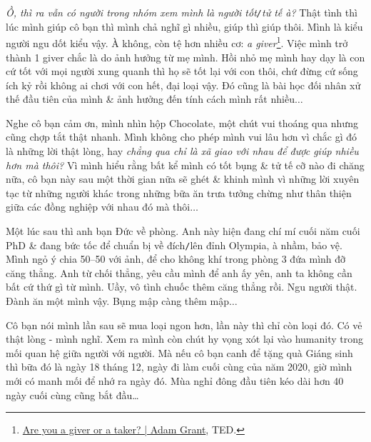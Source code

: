 \documentclass[12pt,twoside]{book}
\begin{document}
{\it Ồ, thì ra vẫn có người trong nhóm xem mình là người tốt{\tt/}tử tế à?} Thật tình thì lúc mình giúp cô bạn thì mình chả nghĩ gì nhiều, giúp thì giúp thôi. Mình là kiểu người ngu dốt kiểu vậy. À không, còn tệ hơn nhiều cơ: {\it a giver}\footnote{\href{https://www.youtube.com/watch?v=YyXRYgjQXX0}{Are you a giver or a taker? | Adam Grant}, TED.}. Việc mình trở thành 1 giver chắc là do ảnh hưởng từ mẹ mình. Hồi nhỏ mẹ mình hay dạy là con cứ tốt với mọi người xung quanh thì họ sẽ tốt lại với con thôi, chứ đừng cứ sống ích kỷ rồi không ai chơi với con hết, đại loại vậy. Đó cũng là bài học đối nhân xử thế đầu tiên của mình \& ảnh hưởng đến tính cách mình rất nhiều$\ldots$

Nghe cô bạn cảm ơn, mình nhìn hộp Chocolate, một chút vui thoáng qua nhưng cũng chợp tắt thật nhanh. Mình không cho phép mình vui lâu hơn vì chắc gì đó là những lời thật lòng, hay {\it chẳng qua chỉ là xã giao với nhau để được giúp nhiều hơn mà thôi?} Vì mình hiểu rằng bất kể mình có tốt bụng \& tử tế cỡ nào đi chăng nữa, cô bạn này sau một thời gian nữa sẽ ghét \& khinh mình vì những lời xuyên tạc từ những người khác trong những bữa ăn trưa tưởng chừng như thân thiện giữa các đồng nghiệp với nhau đó mà thôi$\ldots$

Một lúc sau thì anh bạn Đức về phòng. Anh này hiện đang chí mí cuối năm cuối PhD \& đang bức tốc để chuẩn bị về đích{\tt/}lên đỉnh Olympia, à nhầm, bảo vệ. Mình ngỏ ý chia 50--50 với ảnh, để cho không khí trong phòng 3 đứa mình đỡ căng thẳng. Anh từ chối thẳng, yêu cầu mình để anh ấy yên, anh ta không cần bất cứ thứ gì từ mình. Uầy, vô tình chuốc thêm căng thẳng rồi. Ngu người thật. Đành ăn một mình vậy. Bụng mập càng thêm mập$\ldots$

Cô bạn nói mình lần sau sẽ mua loại ngon hơn, lần này thì chỉ còn loại đó. Có vẻ thật lòng - mình nghĩ. Xem ra mình còn chút hy vọng xót lại vào humanity trong mối quan hệ giữa người với người. Mà nếu cô bạn canh để tặng quà Giáng sinh thì bữa đó là ngày 18 tháng 12, ngày đi làm cuối cùng của năm 2020, giờ mình mới có manh mối để nhớ ra ngày đó. Mùa nghỉ đông đầu tiên kéo dài hơn 40 ngày cuối cùng cũng bắt đầu\ldots
\end{document}
